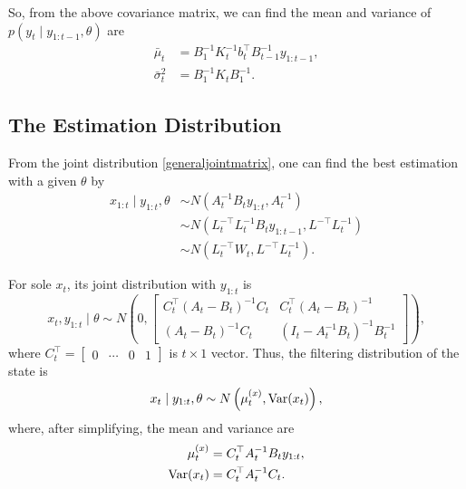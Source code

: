 So, from the above covariance matrix, we can find the mean and variance of $p\left(y_{t}\mid y_{1:t-1},\theta\right)$ are 
\begin{align}
\bar{\mu}_{t} & =  B_1^{-1}K_{t}^{-1}b_{t}^\top B_{t-1}^{-1}y_{1:t-1} ,\\
\bar{\sigma}_{t}^2 & =  B_1^{-1}K_{t}B_1^{-1}  .
\end{align}




\subsection{The Estimation Distribution}\label{generalEstDistr}

From the joint distribution \eqref{generaljointmatrix}, one can find the best estimation with a given $\theta$ by
\begin{equation}\label{estimationdistribution}
\begin{split}
x_{1:t} \mid y_{1:t},\theta &\sim N \left( A_{t}^{-1}B_{t}y_{1:t}, A_{t}^{-1} \right) \\
&\sim N(L_t^{-\top}L_t^{-1}B_{t}y_{1:t-1},L^{-\top}L_t^{-1})\\
&\sim N(L_t^{-\top}W_t,L^{-\top}L_t^{-1}).
\end{split}
\end{equation}

For sole $x_{t}$, its joint distribution with $y_{1:t}$ is 
\begin{equation}\label{joinedXYgiventheta}
x_{t}, y_{1:t}\mid \theta \sim N\left( 0, \begin{bmatrix}
C_{t}^\top(A_{t}-B_{t}) ^{-1}C_{t} & C_{t}^\top (A_{t}-B_{t})^{-1}\\
(A_{t}-B_{t})^{-1}C_{t} & (I_t- A_{t}^{-1}B_{t}) ^{-1}B_{t}^{-1}
\end{bmatrix} \right),
\end{equation}
where $C_t^\top = \begin{bmatrix}0 & \cdots & 0 & 1\end{bmatrix}$ is $t\times 1$ vector. %
Thus, the filtering distribution of the state is 
\begin{equation}
x_{t}\mid y_{1:t},\theta \sim N\left( \mu_{t}^{(x)},\mathrm{Var}(x_{t}) \right),
\end{equation}
where, after simplifying, the mean and variance are  
\begin{align}\label{generalmux}
\mu_{t}^{(x)} & = C_{t}^\top A_{t}^{-1}B_{t}y_{1:t} ,\\
\mathrm{Var}(x_{t})& =C_{t}^\top A_{t}^{-1}C_{t}. \label{generalSigx}
\end{align}

